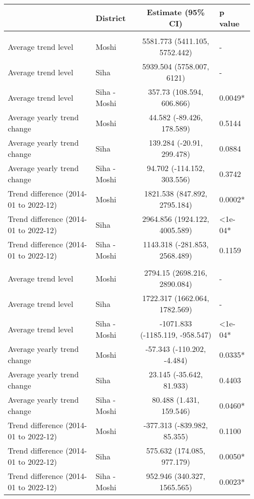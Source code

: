 \begingroup
\fontsize{12.0pt}{14.4pt}\selectfont
\begin{longtable}{l|lcl}
\toprule
 & District & Estimate (95\% CI) & p value \\ 
\midrule\addlinespace[2.5pt]
\multicolumn{4}{l}{Infectious/Communicable Diseases} \\[2.5pt] 
\midrule\addlinespace[2.5pt]
Average trend level & Moshi & 5581.773 (5411.105, 5752.442) & - \\ 
Average trend level & Siha & 5939.504 (5758.007, 6121) & - \\ 
Average trend level & Siha - Moshi & 357.73 (108.594, 606.866) & 0.0049* \\ 
Average yearly trend change & Moshi & 44.582 (-89.426, 178.589) & 0.5144 \\ 
Average yearly trend change & Siha & 139.284 (-20.91, 299.478) & 0.0884 \\ 
Average yearly trend change & Siha - Moshi & 94.702 (-114.152, 303.556) & 0.3742 \\ 
Trend difference (2014-01 to 2022-12) & Moshi & 1821.538 (847.892, 2795.184) & 0.0002* \\ 
Trend difference (2014-01 to 2022-12) & Siha & 2964.856 (1924.122, 4005.589) & <1e-04* \\ 
Trend difference (2014-01 to 2022-12) & Siha - Moshi & 1143.318 (-281.853, 2568.489) & 0.1159 \\ 
\midrule\addlinespace[2.5pt]
\multicolumn{4}{l}{Non-Communicable Diseases} \\[2.5pt] 
\midrule\addlinespace[2.5pt]
Average trend level & Moshi & 2794.15 (2698.216, 2890.084) & - \\ 
Average trend level & Siha & 1722.317 (1662.064, 1782.569) & - \\ 
Average trend level & Siha - Moshi & -1071.833 (-1185.119, -958.547) & <1e-04* \\ 
Average yearly trend change & Moshi & -57.343 (-110.202, -4.484) & 0.0335* \\ 
Average yearly trend change & Siha & 23.145 (-35.642, 81.933) & 0.4403 \\ 
Average yearly trend change & Siha - Moshi & 80.488 (1.431, 159.546) & 0.0460* \\ 
Trend difference (2014-01 to 2022-12) & Moshi & -377.313 (-839.982, 85.355) & 0.1100 \\ 
Trend difference (2014-01 to 2022-12) & Siha & 575.632 (174.085, 977.179) & 0.0050* \\ 
Trend difference (2014-01 to 2022-12) & Siha - Moshi & 952.946 (340.327, 1565.565) & 0.0023* \\ 
\bottomrule
\end{longtable}
\endgroup

